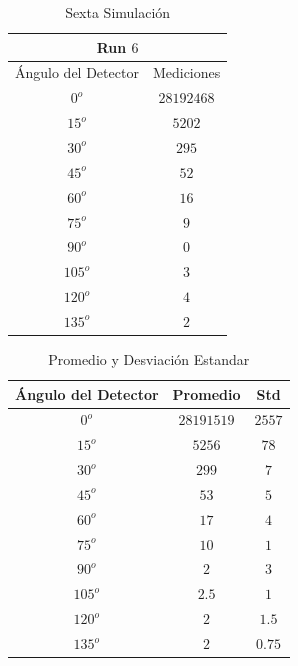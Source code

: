 \documentclass[conference]{IEEEtran}
\begin{document}
\begin{table}[H]
	\centering
	\caption{Sexta Simulación}
	\begin{tabular}{||c|c||}
	\hline
	\hline
	\multicolumn{2}{||c||}{Run $6$} \\
	\hline
	\hline
	Ángulo del Detector & Mediciones \\
	\hline
	$0^o$   & $28192468$ \\
	$15^o$  & $5202$     \\
	$30^o$  & $295$      \\ 
	$45^o$  & $52$       \\
	$60^o$  & $16$       \\
	$75^o$  & $9$        \\
	$90^o$  & $0$        \\
	$105^o$ & $3$        \\
	$120^o$ & $4$        \\
	$135^o$ & $2$        \\
	\hline
	\hline
	\end{tabular}
\end{table}
    
    
    
   
\begin{table}[H]
	\centering
	\caption{Promedio y Desviación Estandar}
	\begin{tabular}{||c|c|c||}
	\hline
	\hline
	Ángulo del Detector & Promedio & Std \\
	\hline
	$0^o$   & $28191519$ & $2557$ \\
	$15^o$  & $5256$     & $78$ \\
	$30^o$  & $299$      & $7$ \\ 
	$45^o$  & $53$       & $5$ \\
	$60^o$  & $17$       & $4$ \\
	$75^o$  & $10$        & $1$ \\
	$90^o$  & $2$        & $3$ \\
	$105^o$ & $2.5$        & $1$ \\
	$120^o$ & $2$        & $1.5$ \\
	$135^o$ & $2$        & $0.75$ \\
	\hline
	\hline
	\end{tabular}
\end{table}
    
    
\end{document}
